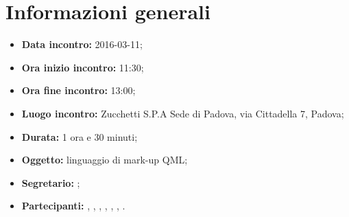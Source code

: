 \newpage
\section{Informazioni generali}
\begin{itemize}
\item \textbf{Data incontro:} 2016-03-11;
\item \textbf{Ora inizio incontro:} 11:30;
\item \textbf{Ora fine incontro:} 13:00;
\item \textbf{Luogo incontro:} Zucchetti S.P.A Sede di Padova, via Cittadella 7, Padova;
\item \textbf{Durata:} 1 ora e 30 minuti;
\item \textbf{Oggetto:} linguaggio di mark-up QML;
\item \textbf{Segretario:} \AF;
\item \textbf{Partecipanti:} \AF, \FB, \GN, \GR, \MV, \MP, \SM.

\end{itemize}
